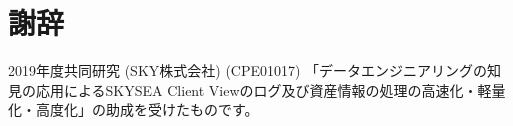 \section{謝辞}
2019年度共同研究 (SKY株式会社) (CPE01017) 「データエンジニアリングの知見の応用によるSKYSEA Client Viewのログ及び資産情報の処理の高速化・軽量化・高度化」の助成を受けたものです。
